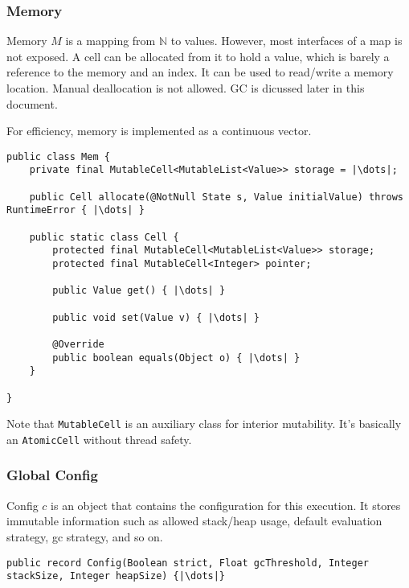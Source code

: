 \documentclass[a4paper]{article}
\begin{document}
\subsubsection{Memory}

Memory $M$ is a mapping from $\mathbb{N}$ to values. However, most interfaces of a map is not exposed. A cell can be allocated from it to hold a value, which is barely a reference to the memory and an index. It can be used to read/write a memory location. Manual deallocation is not allowed. GC is dicussed later in this document.

For efficiency, memory is implemented as a continuous vector.

\begin{verbatim}
public class Mem {
    private final MutableCell<MutableList<Value>> storage = |\dots|;

    public Cell allocate(@NotNull State s, Value initialValue) throws RuntimeError { |\dots| }

    public static class Cell {
        protected final MutableCell<MutableList<Value>> storage;
        protected final MutableCell<Integer> pointer;

        public Value get() { |\dots| }

        public void set(Value v) { |\dots| }

        @Override
        public boolean equals(Object o) { |\dots| }
    }

}
\end{verbatim}

Note that \texttt{MutableCell} is an auxiliary class for interior mutability. It's basically an \texttt{AtomicCell} without thread safety.

\subsubsection{Global Config}

Config $c$ is an object that contains the configuration for this execution. It stores immutable information such as allowed stack/heap usage, default evaluation strategy, gc strategy, and so on.

\begin{verbatim}
public record Config(Boolean strict, Float gcThreshold, Integer stackSize, Integer heapSize) {|\dots|}
\end{verbatim}
\end{document}
